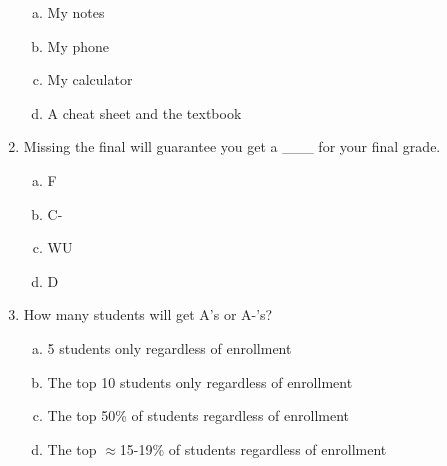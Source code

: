 \begin{enumerate}[1.]
\begin{enumerate}[(a)]
\item My notes
\item My phone
\item My calculator
\item A cheat sheet and the textbook
\end{enumerate}

\item Missing the final will guarantee you get a \_\_\_ for your final grade.

\begin{enumerate}[(a)]
\item F
\item C-
\item WU
\item D
\end{enumerate}

\item How many students will get A's or A-'s?

\begin{enumerate}[(a)]
\item 5 students only regardless of enrollment
\item The top 10 students only regardless of enrollment
\item The top 50\% of students regardless of enrollment
\item The top $\approx$15-19\% of students regardless of enrollment
\end{enumerate}


\end{enumerate}